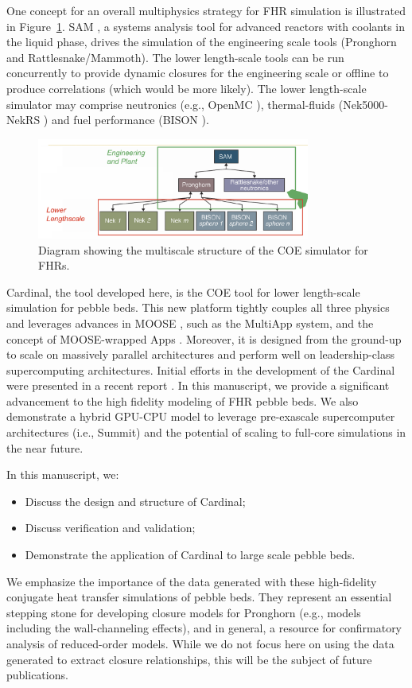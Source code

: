 One concept for an overall multiphysics strategy for FHR simulation is illustrated in Figure~\ref{f:fhr1}. SAM \cite{hu2017sam}, a systems analysis tool for advanced reactors with coolants in the liquid phase, drives the simulation of the engineering scale tools (Pronghorn and Rattlesnake/Mammoth). The lower length-scale tools can be run concurrently to provide dynamic closures for the engineering scale or offline to produce correlations (which would be more likely). The lower length-scale simulator may comprise neutronics (e.g., OpenMC \cite{romano2013openmc}), thermal-fluids (Nek5000-NekRS \cite{fischer2008}) and fuel performance (BISON \cite{hales2013triso}).

\begin{figure}[!h]
\centering
\includegraphics[clip=true,width=0.8\textwidth]{Figures/fhr_graph}
\caption{Diagram showing the multiscale structure of the COE simulator for FHRs.}
\label{f:fhr1}
\end{figure}

Cardinal, the tool developed here, is the COE tool for lower length-scale simulation for pebble beds. This new platform tightly couples all three physics and leverages advances in MOOSE \cite{gaston2009moose, permann2019moose}, such as the MultiApp system, and the concept of MOOSE-wrapped Apps \cite{gastonmultiapps}. Moreover, it is designed from the ground-up to scale on massively parallel architectures and perform well on leadership-class supercomputing architectures. Initial efforts in the development of the Cardinal were presented in a recent report \cite{cardinal}. In this manuscript, we provide a significant advancement to the high fidelity modeling of FHR pebble beds. We also demonstrate a hybrid GPU-CPU model to leverage pre-exascale supercomputer architectures (i.e., Summit) and the potential of scaling to full-core simulations in the near future.

In this manuscript, we:
\begin{itemize}
\item Discuss the design and structure of Cardinal;
\item Discuss verification and validation;
\item Demonstrate the application of Cardinal to large scale pebble beds.
\end{itemize}

We emphasize the importance of the data generated with these high-fidelity conjugate heat transfer simulations of pebble beds. They represent an essential stepping stone for developing closure models for Pronghorn (e.g., models including the wall-channeling effects), and in general, a resource for confirmatory analysis of reduced-order models. While we do not focus here on using the data generated to extract closure relationships, this will be the subject of future publications.
